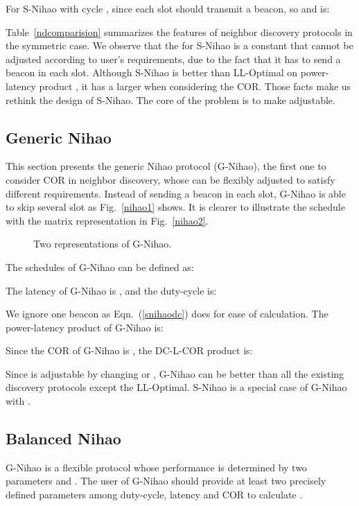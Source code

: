 \documentclass[conference]{IEEEtran}
\begin{document}
For S-Nihao with cycle , since each slot should transmit a beacon, so  and  is:


Table~\ref{ndcomparision} summarizes the features of neighbor discovery protocols in the symmetric case.
We observe that the  for S-Nihao is a constant that cannot be adjusted according to user's requirements,
due to the fact that it has to send a beacon in each slot.
Although S-Nihao is better than LL-Optimal on power-latency product ,
it has a larger  when considering the COR.
Those facts make us rethink the design of S-Nihao.
The core of the problem is to make  adjustable.

\subsection{Generic Nihao}
This section presents the generic Nihao protocol (G-Nihao), the first one to consider COR in neighbor discovery,
whose  can be flexibly adjusted to satisfy different requirements.
Instead of sending a beacon in each slot, G-Nihao is able to skip several slot as Fig.~\ref{nihao1} shows.
It is clearer to illustrate the schedule with the matrix representation in Fig.~\ref{nihao2}.

\begin{figure}[t]
    \centering
\caption{Two representations of G-Nihao.}
\end{figure}

The schedules of G-Nihao can be defined as:


The latency of G-Nihao is , and the duty-cycle is:

We ignore one beacon as Eqn.~(\ref{snihaodc}) does for ease of calculation.
The power-latency product  of G-Nihao is:

Since the COR of G-Nihao is , the DC-L-COR product is:


Since  is adjustable by changing  or , G-Nihao can be better than all the existing discovery protocols except the LL-Optimal.
S-Nihao is a special case of G-Nihao with .

\subsection{Balanced Nihao}
G-Nihao is a flexible protocol whose performance is determined by two parameters  and .
The user of G-Nihao should provide at least two precisely defined parameters among duty-cycle, latency and COR to calculate .
\end{document}
